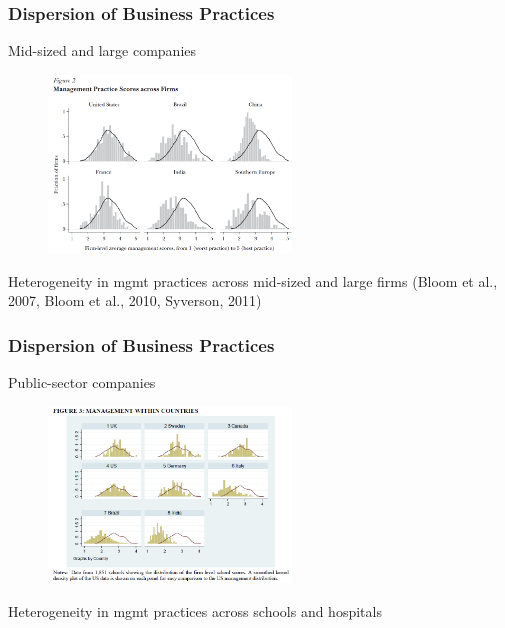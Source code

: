 \documentclass[hideothersubsections, usenames,dvipsnames,11pt]{beamer}
\newenvironment{itemize_2pt}{\itemize\addtolength{\itemsep}{2pt}}{\enditemize}
\begin{document}
\begin{frame}
\frametitle{Dispersion of Business Practices}

Mid-sized and large companies

\begin{figure}[htbp]
	\centering
	\includegraphics[width=17.4em]{pics/Bloom2010_mgmtdispersion.png}
	\label{Bloom(2010): Mgmt practices}
\end{figure}

\vspace{-1.0em}	

\begin{itemize_2pt}
	\item Heterogeneity in mgmt practices across mid-sized and large firms \textcolor{camel}{(Bloom et al., 2007, Bloom et al., 2010, Syverson, 2011)}
\end{itemize_2pt}
\end{frame}


\begin{frame}
\frametitle{Dispersion of Business Practices}

Public-sector companies

\begin{figure}[htbp]
	\centering
	\includegraphics[width=17.4em]{pics/Bloom2015_mgmtdispersion.png}
	\label{Bloom(2015): Mgmt practices}
\end{figure}

\vspace{-1.0em}

\begin{itemize_2pt}
	\item Heterogeneity in mgmt practices across schools \citep{Bloom2015} and hospitals \citep{Bloom2020}
\end{itemize_2pt}
\end{frame}
\end{document}

